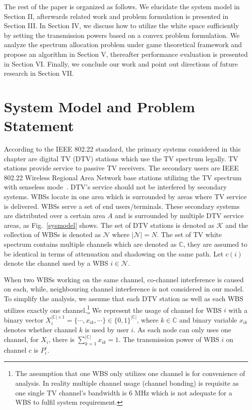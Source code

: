 \documentclass[times]{ettauth}
\theoremstyle{mytheoremstyle}
\theoremstyle{mytheoremstyle}
\theoremstyle{mytheoremstyle}
\begin{document}
The rest of the paper is organized as follows. 
We elucidate the system model in Section II, afterwards related work and problem formulation is presented in Section III. In Section IV, we discuss how to utilize the white space sufficiently by setting the transmission powers based on a convex problem formulation. We analyze the spectrum allocation problem under game theoretical framework and propose an algorithm in Section V, thereafter performance evaluation is presented in Section VI. Finally, we conclude our work and point out directions of future research in Section VII.


\section{System Model and Problem Statement}
\label{SystemModel}
According to the IEEE 802.22 standard, the primary systems considered in this chapter are digital TV (DTV) stations which use the TV spectrum legally. 
TV stations provide service to passive TV receivers.
The secondary users are IEEE 802.22 Wireless Regional Area Network base stations utilizing the TV spectrum with senseless mode~\cite{SenseLess2011}. 
DTV's service should not be interfered by secondary systems. 
WBSs locate in one area which is surrounded by areas where TV service is delivered.
WBSs serve a set of end users/terminals.
These secondary systems are distributed over a certain area $A$ and is surrounded by multiple DTV service areas, as Fig.~\ref{sysmodel} shows. 
The set of DTV stations is denoted as $\mathcal{K}$ and the collection of WBSs is denoted as $\mathcal{N}$ where $|\mathcal{N}|=N$. 
The set of TV white spectrum contains multiple channels which are denoted as $\mathbb{C}$, they are assumed to be identical in terms of attenuation and shadowing on the same path.
Let $c(i)$ denote the channel used by a WBS $i\in \mathcal{N}$.

When two WBSs working on the same channel, co-channel interference is caused on each, while, neighbouring channel interference is not considered in our model. 
To simplify the analysis, we assume that each DTV station as well as each WBS utilizes exactly one channel.\footnote{The assumption that one WBS only utilizes one channel is for convenience of analysis. In reality multiple channel usage (channel bonding) is requisite as one single TV channel's bandwidth is 6 MHz which is not adequate for a WBS to fulfil system requirement. 
}
We represent the usage of channel for WBS $i$ with a binary vector $X_i^{|\mathbb{C}|\times 1}=\{\cdots, x_{ik}, \cdots\}\in \{0,1\}^{|\mathbb{C}|}$, where $k\in \mathbb{C}$ and binary variable $x_{ik}$ denotes whether channel $k$ is used by user $i$. 
As each node can only uses one channel, for $X_i$, there is $\sum_{k=1}^{|\mathbb{C}|}x_{ik}=1$. 
The transmission power of WBS $i$ on channel $c$ is $P_i^c$. 
\end{document}
